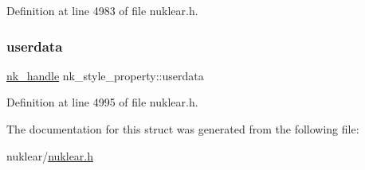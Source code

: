 Definition at line 4983 of file nuklear.\+h.

\mbox{\label{structnk__style__property_a453d9d4df7e05c98746e5fae61725a2f}} 
\subsubsection{\texorpdfstring{userdata}{userdata}}
{\footnotesize\ttfamily \mbox{\hyperlink{unionnk__handle}{nk\+\_\+handle}} nk\+\_\+style\+\_\+property\+::userdata}



Definition at line 4995 of file nuklear.\+h.



The documentation for this struct was generated from the following file\+:\begin{DoxyCompactItemize}
\item 
nuklear/\mbox{\hyperlink{nuklear_8h}{nuklear.\+h}}\end{DoxyCompactItemize}
